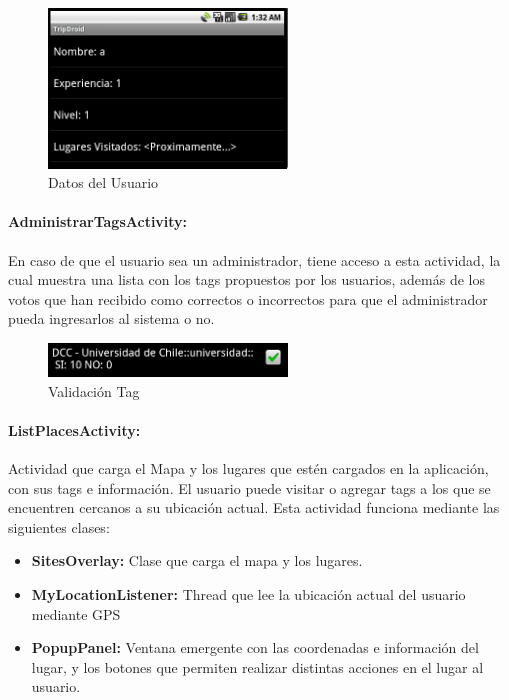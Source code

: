 \documentclass[10pt,letterpaper]{article}
\begin{document}
\begin{figure}[h]
\begin{center}
\includegraphics[width=180pt]{./imgs/TripdroidDatos.png}
\caption{Datos del Usuario}
\end{center}
\end{figure}

\newpage
\paragraph{AdministrarTagsActivity:} En caso de que el usuario sea un administrador, tiene acceso a esta actividad, la cual muestra una lista con los tags propuestos por los usuarios, además de los votos que han recibido como correctos o incorrectos para que el administrador pueda ingresarlos al sistema o no.

\begin{figure}[h]
\begin{center}
\includegraphics[width=180pt]{./imgs/TripdroidAdmin.png}
\caption{Validación Tag}
\end{center}
\end{figure}

\paragraph{ListPlacesActivity:} Actividad que carga el Mapa y los lugares que estén cargados en la aplicación, con sus tags e información. El usuario puede visitar o agregar tags a los que se encuentren cercanos a su ubicación actual. Esta actividad funciona mediante las siguientes clases:\\

\begin{itemize}
 \item \textbf{SitesOverlay:} Clase que carga el mapa y los lugares.
 \item \textbf{MyLocationListener:} Thread que lee la ubicación actual del usuario mediante GPS
 \item \textbf{PopupPanel:} Ventana emergente con las coordenadas e información del lugar, y los botones que permiten realizar distintas acciones en el lugar al usuario.
\end{itemize}
\end{document}
